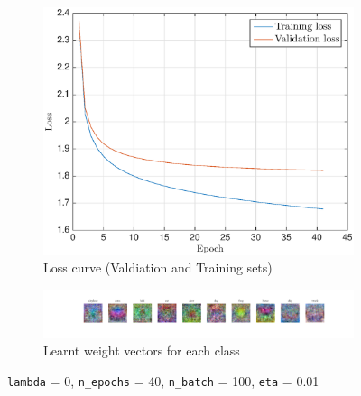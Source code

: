 \documentclass[journal, a4paper]{IEEEtran}
\begin{document}
\begin{figure}[h]
\centering

\begin{subfigure}{0.5\textwidth}
\centering
  \includegraphics[scale=0.47]{figs/Loss_2}
  \caption{Loss curve (Valdiation and Training sets)}
\label{sf:21}
\end{subfigure}

\begin{subfigure}{0.5\textwidth}
  \centering
  \includegraphics[scale=0.25]{figs/WeightMatrix_2}
  \caption{Learnt weight vectors for each class}
\label{sf:22}
\end{subfigure}

  \caption{\texttt{lambda} = 0, \texttt{n\_epochs} = 40, \texttt{n\_batch} = 100, \texttt{eta} = 0.01}
\label{sf:2}

\end{figure}
\end{document}
